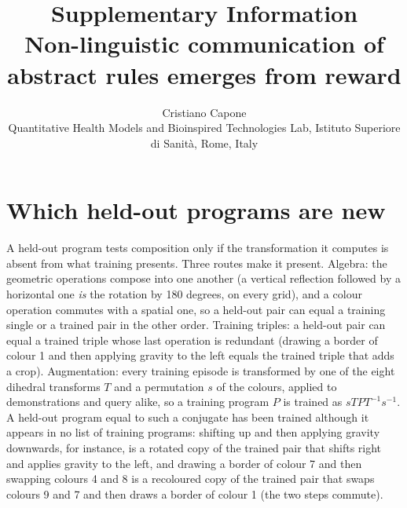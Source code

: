 \documentclass[11pt]{article}
\title{Supplementary Information\\[3pt]\large Non-linguistic communication of abstract rules emerges from reward}
\author{Cristiano Capone\\ \small Quantitative Health Models and Bioinspired Technologies Lab, Istituto Superiore di Sanit\`a, Rome, Italy}
\date{}
\begin{document}
\maketitle

\section{Which held-out programs are new}\label{s:novelty}
A held-out program tests composition only if the transformation it computes is absent from what training presents.
Three routes make it present. Algebra: the geometric operations compose into one another (a vertical reflection
followed by a horizontal one \emph{is} the rotation by 180 degrees, on every grid), and a colour operation commutes
with a spatial one, so a held-out pair can equal a training single or a trained pair in the other order. Training
triples: a held-out pair can equal a trained triple whose last operation is redundant (drawing a border of colour 1
and then applying gravity to the left equals the trained triple that adds a crop). Augmentation: every training
episode is transformed by one of the eight dihedral transforms $T$ and a permutation $s$ of the colours, applied to
demonstrations and query alike, so a training program $P$ is trained as $sTPT^{-1}s^{-1}$. A held-out program equal
to such a conjugate has been trained although it appears in no list of training programs: shifting up and then
applying gravity downwards, for instance, is a rotated copy of the trained pair that shifts right and applies
gravity to the left, and drawing a border of colour 7 and then swapping colours 4 and 8 is a recoloured copy of
the trained pair that swaps colours 9 and 7 and then draws a border of colour 1 (the two steps commute).
\end{document}
